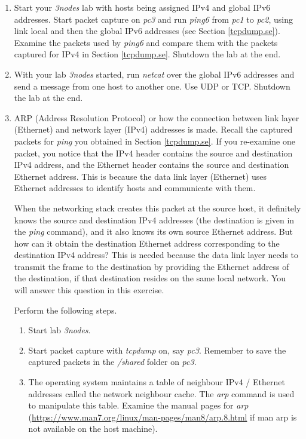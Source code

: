 \documentclass[12pt]{book}
\begin{document}
\begin{enumerate}
\item Start your \emph{3nodes} lab with hosts being assigned IPv4 and global IPv6 addresses. Start packet capture on \emph{pc3} and run \emph{ping6} from \emph{pc1} to \emph{pc2}, using link local and then the global IPv6 addresses (see Section \ref{tcpdump.se}). Examine the packets used by \emph{ping6} and compare them with the packets captured for IPv4 in Section \ref{tcpdump.se}. Shutdown the lab at the end.
  
\item With your lab \emph{3nodes} started, run \emph{netcat} over the global IPv6 addresses and send a message from one host to another one. Use UDP or TCP. Shutdown the lab at the end.

\item\label{arp} ARP (Address Resolution Protocol) or how the connection between link layer (Ethernet) and network layer (IPv4) addresses is made. Recall the captured packets for \emph{ping} you obtained in Section \ref{tcpdump.se}. If you re-examine one packet, you notice that the IPv4 header contains the source and destination IPv4 address, and the Ethernet header contains the source and destination Ethernet address. This is because the data link layer (Ethernet) uses Ethernet addresses to identify hosts and communicate with them.

 When the networking stack creates this packet at the source host, it definitely knows the source and destination IPv4 addresses (the destination is given in the \emph{ping} command), and it also knows its own source Ethernet address. But how can it obtain the destination Ethernet address corresponding to the destination IPv4 address? This is needed because the data link layer needs to transmit the frame to the destination by providing the Ethernet address of the destination, if that destination resides on the same local network. You will answer this question in this exercise.

  Perform the following steps.
  \begin{enumerate}[label=(\roman*)]
  \item\label{first.1} Start lab \emph{3nodes}.
  \item Start packet capture with \emph{tcpdump} on, say \emph{pc3}. Remember to save the captured packets in the \emph{/shared} folder on \emph{pc3}.
  \item The operating system maintains a table of neighbour IPv4 / Ethernet addresses called the network neighbour cache. The \emph{arp} command is used to manipulate this table. Examine the manual pages for \emph{arp} (\url{https://www.man7.org/linux/man-pages/man8/arp.8.html} if man arp is not available on the host machine).


\end{enumerate}
\end{enumerate}
\end{document}
